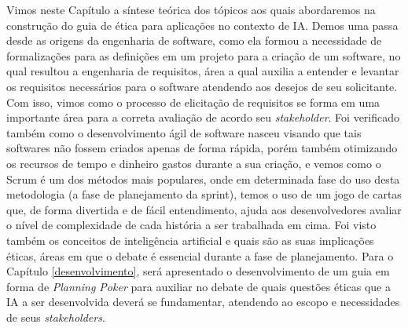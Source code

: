 Vimos neste Capítulo a síntese teórica dos tópicos aos quais abordaremos na construção do guia de ética para aplicações no contexto de \acrshort{IA}. Demos uma passa desde as origens da engenharia de software, como ela formou a necessidade de formalizações para as definições em um projeto para a criação de um software, no qual resultou a engenharia de requisitos, área a qual auxilia a entender e levantar os requisitos necessários para o software atendendo aos desejos de seu solicitante. Com isso, vimos como o processo de elicitação de requisitos se forma em uma importante área para a correta avaliação de acordo seu \textit{stakeholder}. Foi verificado também como o desenvolvimento ágil de software nasceu visando que tais softwares não fossem criados apenas de forma rápida, porém também otimizando os recursos de tempo e dinheiro gastos durante a sua criação, e vemos como o Scrum é um dos métodos mais populares, onde em determinada fase do uso desta metodologia (a fase de planejamento da sprint), temos o uso de um jogo de cartas que, de forma divertida e de fácil entendimento, ajuda aos desenvolvedores avaliar o nível de complexidade de cada história a ser trabalhada em cima. Foi visto também os conceitos de inteligência artificial e quais são as suas implicações éticas, áreas em que o debate é essencial durante a fase de planejamento. Para o Capítulo \ref{desenvolvimento}, será apresentado o desenvolvimento de um guia em forma de \textit{Planning Poker} para auxiliar no debate de quais questões éticas que a \acrshort{IA} a ser desenvolvida deverá se fundamentar, atendendo ao escopo e necessidades de seus \textit{stakeholders}.











